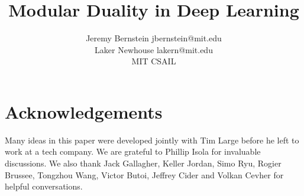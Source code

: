 \documentclass{article}
\title{Modular Duality in Deep Learning}
\author{\name Jeremy Bernstein \email jbernstein@mit.edu \\
\name Laker Newhouse \email lakern@mit.edu \\
      \addr MIT CSAIL
}
\begin{document}
\maketitle





\clearpage

\clearpage




\section*{Acknowledgements}
Many ideas in this paper were developed jointly with Tim Large before he left to work at a tech company.
We are grateful to Phillip Isola for invaluable discussions. We also thank Jack Gallagher, Keller Jordan, Simo Ryu, Rogier Brussee, Tongzhou Wang, Victor Butoi, Jeffrey Cider and Volkan Cevher for helpful conversations.





\newpage
\clearpage
\end{document}
